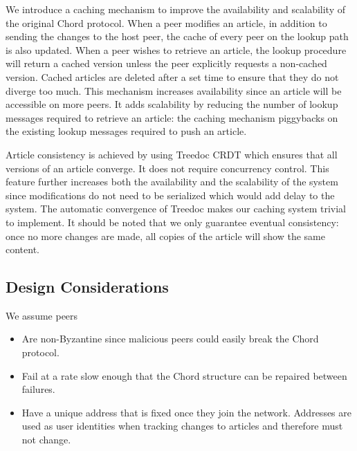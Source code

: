 \documentclass[twocolumn]{article}
\begin{document}
We introduce a caching mechanism to improve the availability and scalability of the original Chord protocol. When a peer modifies an article, in addition to sending the changes to the host peer, the cache of every peer on the lookup path is also updated. When a peer wishes to retrieve an article, the lookup procedure will return a cached version unless the peer explicitly requests a non-cached version. Cached articles are deleted after a set time to ensure that they do not diverge too much. This mechanism increases availability since an article will be accessible on more peers. It adds scalability by reducing the number of lookup messages required to retrieve an article: the caching mechanism piggybacks on the existing lookup messages required to push an article.

Article consistency is achieved by using Treedoc CRDT which ensures that all versions of an article converge. It does not require concurrency control. This feature further increases both the availability and the scalability of the system since modifications do not need to be serialized which would add delay to the system. The automatic convergence of Treedoc makes our caching system trivial to implement. It should be noted that we only guarantee eventual consistency: once no more changes are made, all copies of the article will show the same content.

\subsection{Design Considerations}
We assume peers
\begin{itemize}
  \item Are non-Byzantine since malicious peers could easily break the Chord protocol.
  \item Fail at a rate slow enough that the Chord structure can be repaired between failures.
  \item Have a unique address that is fixed once they join the network. Addresses are used as user identities when tracking changes to articles and therefore must not change.
\end{itemize}
\end{document}
